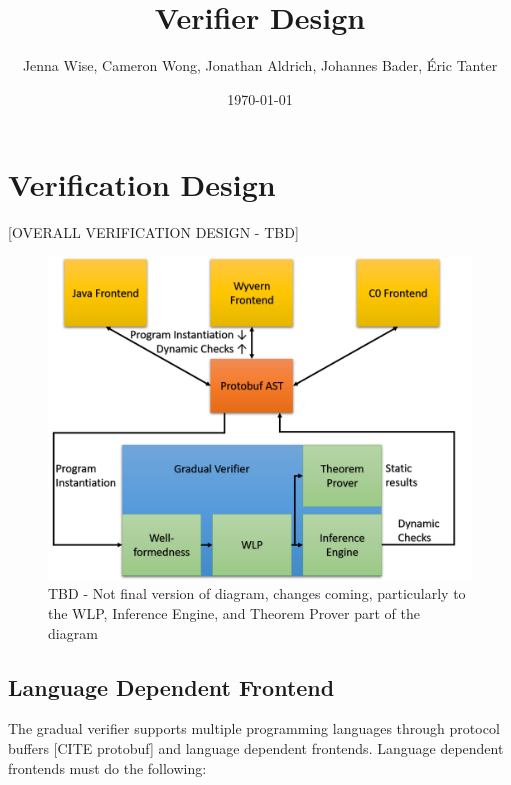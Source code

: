 \documentclass {article}
\title {Verifier Design}
\author {Jenna Wise, Cameron Wong, Jonathan Aldrich, Johannes Bader, \'{E}ric Tanter}
\date {\today}
\begin{document}
\maketitle

\section{Verification Design}
[OVERALL VERIFICATION DESIGN - TBD]

%
%
%
%
\begin{figure}[!ht]
	\centering
	\includegraphics[width=15cm]{resources/architecture}
	\caption{TBD - Not final version of diagram, changes coming, particularly to the WLP, Inference Engine, and Theorem Prover part of the diagram}
	\label{fig:architecture}
\end{figure}

\subsection{Language Dependent Frontend}
The gradual verifier supports multiple programming languages through protocol buffers [CITE protobuf] and language dependent frontends. Language dependent frontends must do the following:
\end{document}
